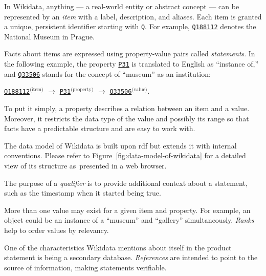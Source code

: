 In Wikidata, anything --- a real-world entity or abstract concept --- can be represented by an \emph{item} with a label, description, and aliases. Each item is granted a unique, persistent identifier starting with \texttt{Q}. For example, \href{http://www.wikidata.org/entity/Q188112}{\texttt{Q188112}} denotes the National Museum in Prague.

Facts about items are expressed using property-value pairs called \emph{statements}. In the following example, the property \href{http://www.wikidata.org/prop/direct/P31}{\texttt{P31}} is translated to English as ``instance of,'' and \href{http://www.wikidata.org/entity/Q33506}{\texttt{Q33506}} stands for the concept of ``museum'' as an institution:

\begin{center}
\href{http://www.wikidata.org/entity/Q188112}{\texttt{Q188112}}${}^{\text{(item)}}$ \enspace $\rightarrow$ \enspace \href{http://www.wikidata.org/prop/direct/P31}{\texttt{P31}}${}^{\text{(property)}}$ \enspace $\rightarrow$ \enspace \href{http://www.wikidata.org/entity/Q33506}{\texttt{Q33506}}${}^{\text{(value)}}$.
\end{center}

To put it simply, a property describes a relation between an item and a value. Moreover, it restricts the data type of the value and possibly its range so that facts have a predictable structure and are easy to work with.

The data model of Wikidata is built upon \acs{rdf} but extends it with internal conventions. Please refer to Figure~\ref{fig:data-model-of-wikidata} for a detailed view of its structure as~pre\-sent\-ed in a web browser.

The purpose of a \emph{qualifier} is to provide additional context about a statement, such as the timestamp when it started being true.

More than one value may exist for a given item and property. For example, an object could be an instance of a ``museum'' and ``gallery'' simultaneously. \emph{Ranks} help to order values by relevancy.

One of the characteristics Wikidata mentions about itself in the product statement is being a secondary database. \emph{References} are intended to point to the source of information, making statements verifiable.

